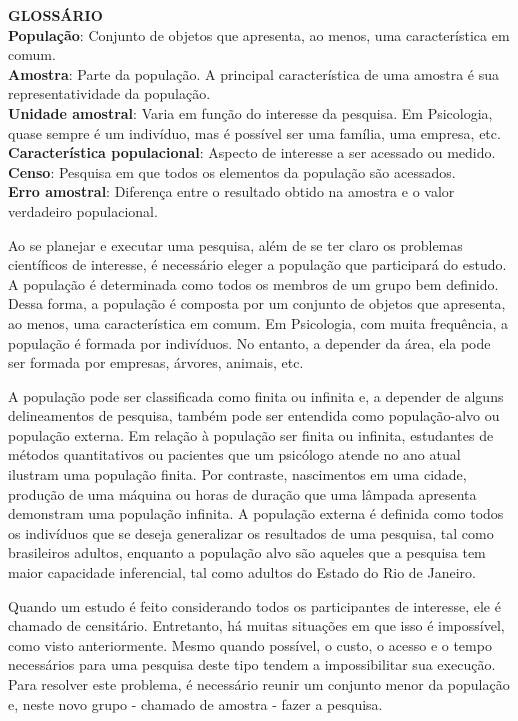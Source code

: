 \documentclass[
]{book}
\newenvironment{glossario}{
  \definecolor{shadecolor}{rgb}{0, 0, 0}  %
  \color{white}
  \begin{shaded}}
 {\end{shaded}}
\begin{document}
\begin{glossario}

\textbf{GLOSSÁRIO}\\
\textbf{População}: Conjunto de objetos que apresenta, ao menos, uma característica em comum.\\
\textbf{Amostra}: Parte da população. A principal característica de uma amostra é sua representatividade da população.\\
\textbf{Unidade amostral}: Varia em função do interesse da pesquisa. Em Psicologia, quase sempre é um indivíduo, mas é possível ser uma família, uma empresa, etc.\\
\textbf{Característica populacional}: Aspecto de interesse a ser acessado ou medido.\\
\textbf{Censo}: Pesquisa em que todos os elementos da população são acessados.\\
\textbf{Erro amostral}: Diferença entre o resultado obtido na amostra e o valor verdadeiro populacional.

\end{glossario}

Ao se planejar e executar uma pesquisa, além de se ter claro os problemas científicos de interesse, é necessário eleger a população que participará do estudo. A população é determinada como todos os membros de um grupo bem definido. Dessa forma, a população é composta por um conjunto de objetos que apresenta, ao menos, uma característica em comum. Em Psicologia, com muita frequência, a população é formada por indivíduos. No entanto, a depender da área, ela pode ser formada por empresas, árvores, animais, etc.

A população pode ser classificada como finita ou infinita e, a depender de alguns delineamentos de pesquisa, também pode ser entendida como população-alvo ou população externa. Em relação à população ser finita ou infinita, estudantes de métodos quantitativos ou pacientes que um psicólogo atende no ano atual ilustram uma população finita. Por contraste, nascimentos em uma cidade, produção de uma máquina ou horas de duração que uma lâmpada apresenta demonstram uma população infinita. A população externa é definida como todos os indivíduos que se deseja generalizar os resultados de uma pesquisa, tal como brasileiros adultos, enquanto a população alvo são aqueles que a pesquisa tem maior capacidade inferencial, tal como adultos do Estado do Rio de Janeiro.

Quando um estudo é feito considerando todos os participantes de interesse, ele é chamado de censitário. Entretanto, há muitas situações em que isso é impossível, como visto anteriormente. Mesmo quando possível, o custo, o acesso e o tempo necessários para uma pesquisa deste tipo tendem a impossibilitar sua execução. Para resolver este problema, é necessário reunir um conjunto menor da população e, neste novo grupo - chamado de amostra - fazer a pesquisa.
\end{document}

